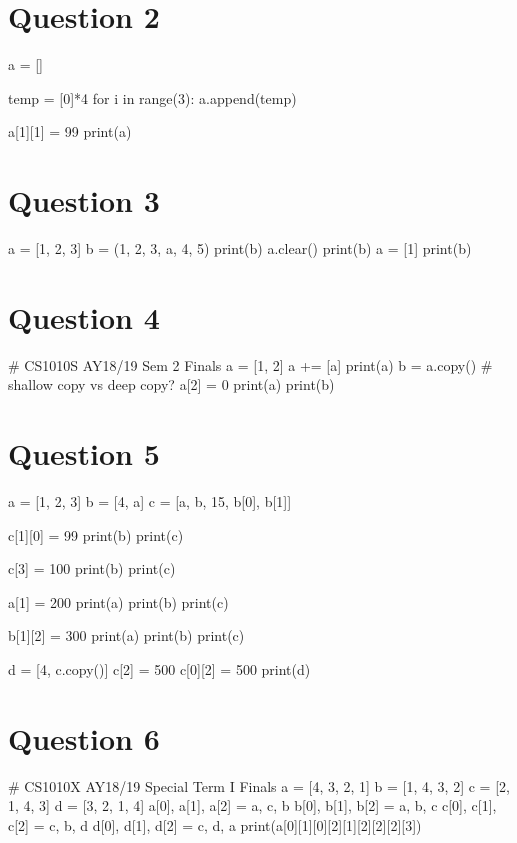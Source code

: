 \section{Question 2}
\begin{python}
a = []

temp = [0]*4
for i in range(3):
    a.append(temp)

a[1][1] = 99
print(a)
\end{python}

\section{Question 3}
\begin{python}
a = [1, 2, 3]
b = (1, 2, 3, a, 4, 5)
print(b)
a.clear()
print(b)
a = [1]
print(b)
\end{python}

\section{Question 4}
\begin{python}
# CS1010S AY18/19 Sem 2 Finals
a = [1, 2]
a += [a]
print(a)
b = a.copy() # shallow copy vs deep copy?
a[2] = 0
print(a)
print(b)
\end{python}

\section{Question 5}
\begin{python}
a = [1, 2, 3]
b = [4, a]
c = [a, b, 15, b[0], b[1]]

c[1][0] = 99
print(b)
print(c)

c[3] = 100
print(b)
print(c)

a[1] = 200
print(a)
print(b)
print(c)

b[1][2] = 300
print(a)
print(b)
print(c)

d = [4, c.copy()]
c[2] = 500
c[0][2] = 500
print(d)
\end{python}

\section{Question 6}
\begin{python}
# CS1010X AY18/19 Special Term I Finals
a = [4, 3, 2, 1]
b = [1, 4, 3, 2]
c = [2, 1, 4, 3]
d = [3, 2, 1, 4]
a[0], a[1], a[2] = a, c, b
b[0], b[1], b[2] = a, b, c
c[0], c[1], c[2] = c, b, d
d[0], d[1], d[2] = c, d, a
print(a[0][1][0][2][1][2][2][2][3])
\end{python}

